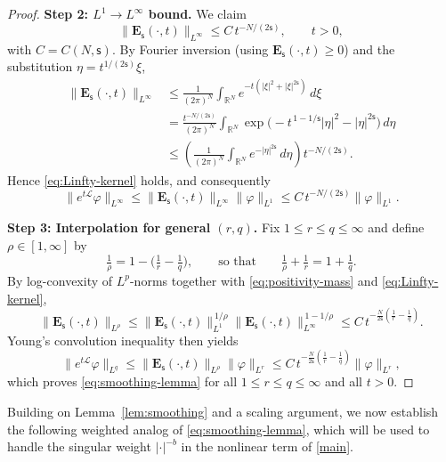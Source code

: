 \documentclass[12pt,reqno]{amsart}
\theoremstyle{plain}
\theoremstyle{definition}
\theoremstyle{remark}
\numberwithin{equation}{section}
\newcommand{\ts}{\mathsf{s}}
\begin{document}
\begin{proof}
\medskip
\noindent\textbf{Step 2: $L^{1}\!\to\!L^{\infty}$ bound.}
We claim
\begin{equation}\label{eq:Linfty-kernel}
\|\mathbf{E}_{\ts}(\cdot,t)\|_{L^{\infty}}\leq C\,t^{-N/(2\ts)},\qquad t>0,
\end{equation}
with $C=C(N,\ts)$. By Fourier inversion (using $\mathbf{E}_{\ts}(\cdot,t)\geq 0$) and the substitution $\eta=t^{1/(2\ts)}\xi$,
\begin{equation}\label{eq:rescale}
\begin{split}
\|\mathbf{E}_{\ts}(\cdot,t)\|_{L^{\infty}}
&\leq\frac{1}{(2\pi)^{N}}\int_{\mathbb{R}^{N}}e^{-t(|\xi|^{2}+|\xi|^{2\ts})}\,d\xi \\
&=\frac{t^{-N/(2\ts)}}{(2\pi)^{N}}\int_{\mathbb{R}^{N}}\exp\!\bigl(-t^{\,1-1/\ts}|\eta|^{2}-|\eta|^{2\ts}\bigr)\,d\eta \\
&\leq \left(\frac{1}{(2\pi)^{N}}\int_{\mathbb{R}^{N}}e^{-|\eta|^{2\ts}}\,d\eta\right)t^{-N/(2\ts)}.
\end{split}
\end{equation}
Hence \eqref{eq:Linfty-kernel} holds, and consequently
\begin{equation}\label{eq:L1Linfty}
\|e^{t\mathscr{L}}\varphi\|_{L^{\infty}}
\leq\|\mathbf{E}_{\ts}(\cdot,t)\|_{L^{\infty}}\|\varphi\|_{L^{1}}
\leq C\,t^{-N/(2\ts)}\|\varphi\|_{L^{1}}.
\end{equation}

\medskip
\noindent\textbf{Step 3: Interpolation for general $(r,q)$.}
Fix $1\leq r\leq q\leq\infty$ and define $\rho\in[1,\infty]$ by
\[
\tfrac{1}{\rho}=1-\bigl(\tfrac{1}{r}-\tfrac{1}{q}\bigr),
\qquad\text{so that}\qquad
\tfrac{1}{\rho}+\tfrac{1}{r}=1+\tfrac{1}{q}.
\]
By log-convexity of $L^{p}$-norms together with \eqref{eq:positivity-mass} and \eqref{eq:Linfty-kernel},
\[
\|\mathbf{E}_{\ts}(\cdot,t)\|_{L^{\rho}}
\leq\|\mathbf{E}_{\ts}(\cdot,t)\|_{L^{1}}^{\,1/\rho}
\|\mathbf{E}_{\ts}(\cdot,t)\|_{L^{\infty}}^{\,1-1/\rho}
\leq C\,t^{-\frac{N}{2\ts}\left(\frac{1}{r}-\frac{1}{q}\right)}.
\]
Young's convolution inequality then yields
\[
\|e^{t\mathscr{L}}\varphi\|_{L^{q}}
\leq\|\mathbf{E}_{\ts}(\cdot,t)\|_{L^{\rho}}\|\varphi\|_{L^{r}}
\leq C\,t^{-\frac{N}{2\ts}\left(\frac{1}{r}-\frac{1}{q}\right)}\|\varphi\|_{L^{r}},
\]
which proves \eqref{eq:smoothing-lemma} for all $1\leq r\leq q\leq\infty$ and all $t>0$.
\end{proof}

\medskip

Building on Lemma~\ref{lem:smoothing} and a scaling argument, we now establish the following weighted analog of \eqref{eq:smoothing-lemma}, which will be used to handle the singular weight $|\cdot|^{-b}$ in the nonlinear term of \eqref{main}.
\end{document}
